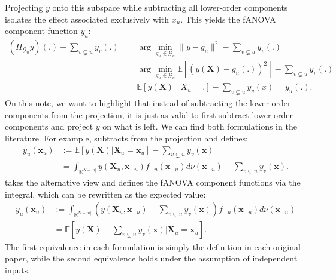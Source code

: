 Projecting $y$ onto this subspace while subtracting all lower-order components 
isolates the effect associated exclusively with $x_u$. This yields the fANOVA component function $y_u$:
\begin{align*}
    (\Pi_{\mathcal{G}_u}y)(.) - \sum_{v \subsetneq u} y_v(.)
    &= \arg \min_{g_u \in \mathcal{G}_u} \|y - g_u\|^2 - \sum_{v \subsetneq u} y_v(.)\\
    &= \arg \min_{g_u \in \mathcal{G}_{u}} \mathbb{E}[(y(\boldsymbol{X}) - g_u(.))^2] - \sum_{v \subsetneq u} y_v(.)\\
    &= \mathbb{E}[y(\boldsymbol{X}) \mid X_{u} = .] - \sum_{v \subsetneq u} y_v(x) = y_u(.).
\end{align*}
On this note, we want to highlight that instead of subtracting the lower order components from the projection, it is just as valid to first subtract lower-order components and project $y$ on what is left.
We can find both formulations in the literature.
For example, \cite{muehlenstaedt2012} subtracts from the projection and defines:
\begin{align*}
    y_u(\boldsymbol{x}_u) &:=
    \mathbb{E}[y(\boldsymbol{X}) | \boldsymbol{X}_{u} = \boldsymbol{x}_u] - \sum_{v \subsetneq u} y_v(\boldsymbol{x}) \\
    &= \int_{\mathbb{R}^{N-|u|}} y(\boldsymbol{X}_u, \boldsymbol{x}_{-u}) f_{-u}(\boldsymbol{x}_{-u}) d \nu(\boldsymbol{x}_{-u}) - \sum_{v \subsetneq u} y_v(\boldsymbol{x}).
\end{align*}
\cite{hooker2004} takes the alternative view and defines the fANOVA component functions via the integral, which can be rewritten as the expected value:
\begin{align*}
    y_u(\boldsymbol{x}_u)
    &:= \int_{\mathbb{R}^{N-|u|}} (y(\boldsymbol{X}_{u}, \boldsymbol{x}_{-u}) - \sum_{v \subsetneq u} y_v(\boldsymbol{x})) f_{-u}(\boldsymbol{x}_{-u}) d \nu(\boldsymbol{x}_{-u}) \\
    &= \mathbb{E}[y(\boldsymbol{X}) - \sum_{v \subsetneq u} y_v(\boldsymbol{x}) | \boldsymbol{X}_{u} = \boldsymbol{x}_u ].
\end{align*}
The first equivalence in each formulation is simply the definition in each original paper, while the second equivalence holds under the assumption of independent inputs.

